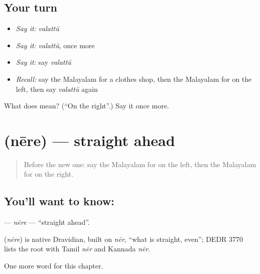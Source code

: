 \subsection*{Your turn}
\begin{itemize}
\raggedright
  \item \emph{Say it:} \emph{valattŭ}
  \item \emph{Say it:} \emph{valattŭ}, once more
  \item \emph{Say it:} say \emph{valattŭ}
  \item \emph{Recall:} say the Malayalam for a clothes shop, then the Malayalam for on the left, then say \emph{valattŭ} again
\end{itemize}

\begin{tcolorbox}[breakable,colback=teal!4,colframe=teal!35!black,title={Before you move on}]
What does  mean? (\textquotedblleft{}On the right\textquotedblright{}.) Say it once more.
\end{tcolorbox}
\section[\texorpdfstring{\ml{നേരെ} (nēre)}{നേരെ (nēre)}]{ (nēre) — straight ahead}

\label{lesson:ML-C197-nere}



\begin{quote}
Before the new one: say the Malayalam for on the left, then the Malayalam for on the right.
\end{quote}

\subsection*{You'll want to know: }
\textbf{} — \emph{nēre} — \textquotedblleft{}straight ahead\textquotedblright{}.

\begin{cousinweb}
\textbf{} (\emph{nēre}) is native Dravidian, built on \emph{nēr}, \textquotedblleft{}what is straight, even\textquotedblright{}; DEDR 3770 lists the root with Tamil \emph{nēr} and Kannada \emph{nēr}.
\end{cousinweb}

\begin{grammarlens}[title={What you've built}]
One more word for this chapter.
\end{grammarlens}

